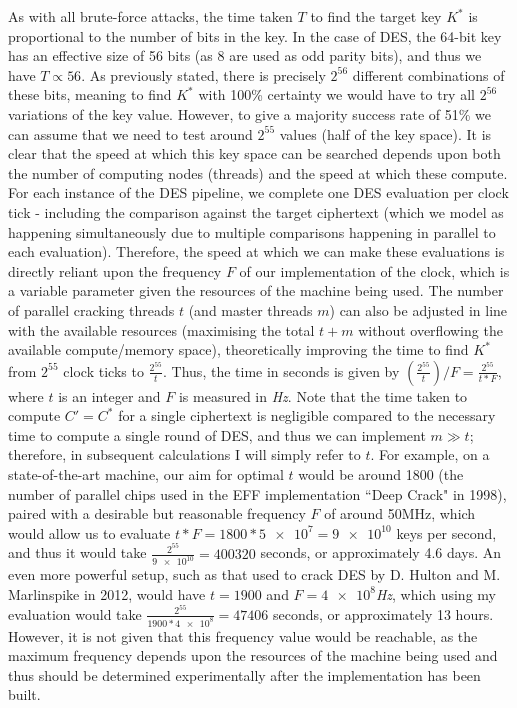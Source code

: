 \documentclass[a4paper, 11pt]{article}
\begin{document}
As with all brute-force attacks, the time taken $T$ to find the target key $K^{*}$ is proportional to the number of bits in the key. In the case of DES, the 64-bit key has an effective size of 56 bits (as 8 are used as odd parity bits), and thus we have $T \propto 56$. As previously stated, there is precisely $2^{56}$ different combinations of these bits, meaning to find $K^{*}$ with 100\% certainty we would have to try all  $2^{56}$ variations of the key value. However, to give a majority success rate of 51\% we can assume that we need to test around $2^{55}$ values (half of the key space). It is clear that the speed at which this key space can be searched depends upon both the number of computing nodes (threads) and the speed at which these compute. For each instance of the DES pipeline, we complete one DES evaluation per clock tick - including the comparison against the target ciphertext (which we model as happening simultaneously due to multiple comparisons happening in parallel to each evaluation). Therefore, the speed at which we can make these evaluations is directly reliant upon the frequency $F$ of our implementation of the clock, which is a variable parameter given the resources of the machine being used. The number of parallel cracking threads $t$ (and master threads $m$) can also be adjusted in line with the available resources (maximising the total $t+m$ without overflowing the available compute/memory space), theoretically improving the time to find $K^{*}$ from $2^{55}$ clock ticks to $\frac{2^{55}}{t}$. Thus, the time in seconds is given by $(\frac{2^{55}}{t})/F = \frac{2^{55}}{t*F}$, where $t$ is an integer and $F$ is measured in \emph{Hz}. Note that the time taken to compute $C' = C^{*}$ for a single ciphertext is negligible compared to the necessary time to compute a single round of DES, and thus we can implement $m \gg t$; therefore, in subsequent calculations I will simply refer to $t$. For example, on a state-of-the-art machine, our aim for optimal $t$ would be around 1800 (the number of parallel chips used in the EFF implementation ``Deep Crack" in 1998), paired with a desirable but reasonable frequency $F$ of around 50MHz, which would allow us to evaluate $t * F = 1800 * \num{5e7} = \num{9e10}$ keys per second, and thus it would take $\frac{2^{55}}{\num{9e10}} = 400320$ seconds, or approximately 4.6 days. An even more powerful setup, such as that used to crack DES by D. Hulton and M. Marlinspike in 2012, would have $t = 1900$ and $F = \num{4e8}$\emph{Hz}, which using my evaluation would take $\frac{2^{55}}{1900 * \num{4e8}} = 47406$ seconds, or approximately 13 hours. However, it is not given that this frequency value would be reachable, as the maximum frequency depends upon the resources of the machine being used and thus should be determined experimentally after the implementation has been built.
    
\end{document}
